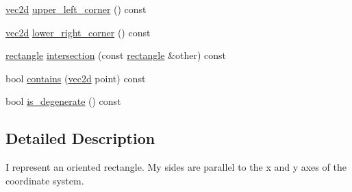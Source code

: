 \begin{DoxyCompactItemize}
\item 
\hyperlink{classcsis3700_1_1vec2d}{vec2d} \hyperlink{classcsis3700_1_1rectangle_aab0dc95e90e205d5e4f5e7f636fee8e3}{upper\-\_\-left\-\_\-corner} () const 
\item 
\hyperlink{classcsis3700_1_1vec2d}{vec2d} \hyperlink{classcsis3700_1_1rectangle_a5ba599fc8d08e36be15c7d4e017f9d8b}{lower\-\_\-right\-\_\-corner} () const 
\item 
\hyperlink{classcsis3700_1_1rectangle}{rectangle} \hyperlink{classcsis3700_1_1rectangle_a3f9209f4029bbf57b117d509e041265c}{intersection} (const \hyperlink{classcsis3700_1_1rectangle}{rectangle} \&other) const 
\item 
bool \hyperlink{classcsis3700_1_1rectangle_a1dadf9d8f1f9333a3c5f24e8be295735}{contains} (\hyperlink{classcsis3700_1_1vec2d}{vec2d} point) const 
\item 
bool \hyperlink{classcsis3700_1_1rectangle_ae19050257ed8eb56aab750134798ba7e}{is\-\_\-degenerate} () const 
\end{DoxyCompactItemize}


\subsection{Detailed Description}
I represent an oriented rectangle. My sides are parallel to the x and y axes of the coordinate system. 

